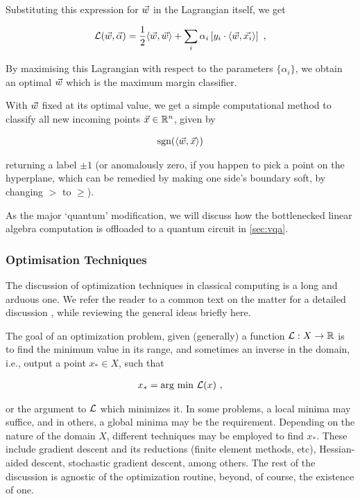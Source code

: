 Substituting this expression for \(\vec{w}\) in the Lagrangian itself, we get

\begin{gather}
    \mathcal{L}(\vec{w}, \vec{\alpha}) = \frac{1}{2} \langle \vec{w}, \vec{w}\rangle + \sum_i \alpha_i \left[y_i \cdot \langle \vec{w}, \vec{x_i}\rangle\right]~,
\end{gather}

By maximising this Lagrangian with respect to the parameters \(\{\alpha_i\}\),
we obtain an optimal \(\vec{w}\) which is the maximum margin classifier.

With \(\vec{w}\) fixed at its optimal value, we get a simple computational method
to classify all new incoming points \(\vec{x} \in \mathbb{R}^n\), given by

\begin{gather}
    \text{sgn}(\langle \vec{w}, \vec{x}\rangle)
\end{gather}

returning a label \(\pm 1\) (or anomalously zero, if you happen to pick a point
on the hyperplane, which can be remedied by making one side's boundary soft, by
changing \(>\) to \(\geq\)).

As the major `quantum' modification, we will discuss how the bottlenecked linear
algebra computation is offloaded to a quantum circuit in \autoref{sec:vqa}.

\subsubsection{Optimisation Techniques}
The discussion of optimization techniques in classical computing is a long and
arduous one. We refer the reader to a common text on the matter for a detailed
discussion \cite{boyd2004convex,nocedal2006numerical}, while reviewing the
general ideas briefly here.

The goal of an optimization problem, given (generally) a function
\(\mathcal{L}:X\to\mathbb{R}\) is to find the minimum value in its range, and sometimes an
inverse in the domain, i.e., output a point \(x_* \in X\), such that

\begin{gather*}
    x_* = \text{arg min } \mathcal{L}(x)~,
\end{gather*}

or the argument to \(\mathcal{L}\) which minimizes it. In some problems, a local
minima may suffice, and in others, a global minima may be the requirement.
Depending on the nature of the domain \(X\), different techniques may be
employed to find \(x_*\). These include gradient descent and its reductions
(finite element methods, etc), Hessian-aided descent,  stochastic gradient
descent, among others. The rest of the discussion is agnostic of the
optimization routine, beyond, of course, the existence of one.

